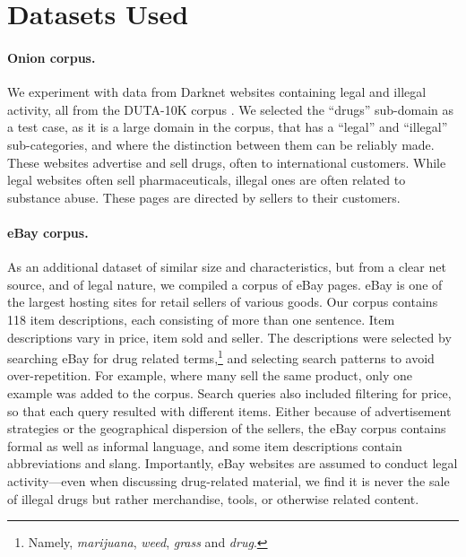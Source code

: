 \documentclass[11pt,a4paper,table]{article}
\begin{document}
\section{Datasets Used}\label{sec:datasets}

\paragraph{Onion corpus.}
We experiment with data from Darknet websites containing
legal and illegal activity, all from the DUTA-10K corpus \citep{AlNabki19}.
We selected the ``drugs'' sub-domain as a test case, as it is a large domain in the corpus,
that has a ``legal'' and ``illegal'' sub-categories, and where the distinction between them 
can  be reliably made.
These websites advertise and sell
drugs, often to international customers.
While legal websites often sell pharmaceuticals,
illegal ones are often related to substance abuse.
These pages are directed by sellers to their customers.
  

\paragraph{eBay corpus.}
As an additional dataset of similar size and characteristics,
but from a clear net source, and of legal nature,
we compiled a corpus of eBay pages.
eBay is one of the largest hosting sites for retail sellers of various goods. Our corpus contains 118 item descriptions, each consisting of more than one sentence.
Item descriptions vary in price, item sold and seller. The descriptions were selected by searching eBay for drug related terms,\footnote{Namely,  \textit{marijuana}, \textit{weed}, \textit{grass} and \textit{drug}.} and selecting search patterns to avoid over-repetition. For example, where many sell the same product, only one example was added to the corpus. Search queries also included filtering for price, so that each query resulted with different items. Either because of advertisement strategies or the geographical dispersion of the  sellers, the eBay corpus contains formal as well as informal language, and some item descriptions contain abbreviations and slang.
Importantly, eBay websites are assumed to conduct legal activity---even
  when discussing drug-related material, we find it is never the sale of illegal
  drugs but rather merchandise, tools, or otherwise related content.
\end{document}
